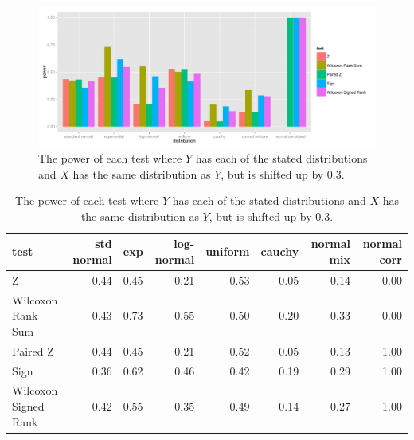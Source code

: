 \documentclass[11pt]{article}
\begin{document}
\begin{figure}[H]
\centering
\includegraphics[scale = 0.6]{part2.pdf}
\caption{The power of each test where $Y$ has each of the stated distributions and $X$ has the same distribution as $Y$, but is shifted up by 0.3.}
\label{fig:part2}
\end{figure}


\begin{table}[ht]
\centering
\begin{tabular}{lrrrrrrr}
  \hline
test & std normal & exp & log-normal & uniform & cauchy & normal mix & normal corr \\ 
  \hline
Z & 0.44 & 0.45 & 0.21 & 0.53 & 0.05 & 0.14 & 0.00 \\ 
 Wilcoxon Rank Sum & 0.43 & 0.73 & 0.55 & 0.50 & 0.20 & 0.33 & 0.00 \\ 
 Paired Z & 0.44 & 0.45 & 0.21 & 0.52 & 0.05 & 0.13 & 1.00 \\ 
  Sign & 0.36 & 0.62 & 0.46 & 0.42 & 0.19 & 0.29 & 1.00 \\ 
  Wilcoxon Signed Rank & 0.42 & 0.55 & 0.35 & 0.49 & 0.14 & 0.27 & 1.00 \\ 
   \hline
\end{tabular}
\caption{The power of each test where $Y$ has each of the stated distributions and $X$ has the same distribution as $Y$, but is shifted up by 0.3.}
\label{tab:part2}
\end{table}
\end{document}
